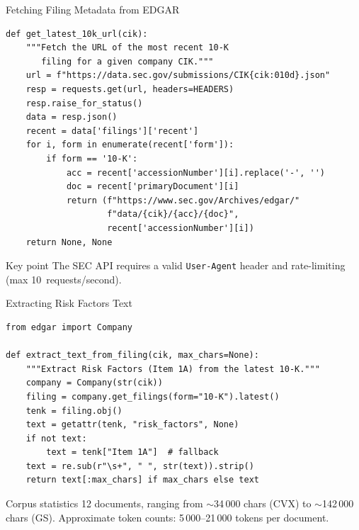 \documentclass[aspectratio=169,11pt]{beamer}
\begin{document}
\begin{frame}[fragile]{Fetching Filing Metadata from EDGAR}

\begin{lstlisting}
def get_latest_10k_url(cik):
    """Fetch the URL of the most recent 10-K
       filing for a given company CIK."""
    url = f"https://data.sec.gov/submissions/CIK{cik:010d}.json"
    resp = requests.get(url, headers=HEADERS)
    resp.raise_for_status()
    data = resp.json()
    recent = data['filings']['recent']
    for i, form in enumerate(recent['form']):
        if form == '10-K':
            acc = recent['accessionNumber'][i].replace('-', '')
            doc = recent['primaryDocument'][i]
            return (f"https://www.sec.gov/Archives/edgar/"
                    f"data/{cik}/{acc}/{doc}",
                    recent['accessionNumber'][i])
    return None, None
\end{lstlisting}

\begin{block}{Key point}
The SEC API requires a valid \texttt{User-Agent} header and
rate-limiting (max 10~requests/second).
\end{block}

\end{frame}

\begin{frame}[fragile]{Extracting Risk Factors Text}

\begin{lstlisting}
from edgar import Company

def extract_text_from_filing(cik, max_chars=None):
    """Extract Risk Factors (Item 1A) from the latest 10-K."""
    company = Company(str(cik))
    filing = company.get_filings(form="10-K").latest()
    tenk = filing.obj()
    text = getattr(tenk, "risk_factors", None)
    if not text:
        text = tenk["Item 1A"]  # fallback
    text = re.sub(r"\s+", " ", str(text)).strip()
    return text[:max_chars] if max_chars else text
\end{lstlisting}

\vspace{6pt}
\small
\begin{block}{Corpus statistics}
12 documents, ranging from $\sim$34\,000 chars (CVX)
to $\sim$142\,000 chars (GS).
Approximate token counts: 5\,000--21\,000 tokens per document.
\end{block}

\end{frame}
\end{document}
